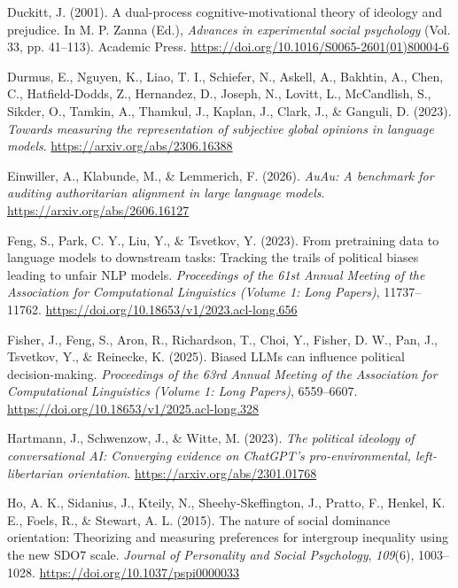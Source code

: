 \documentclass[
]{article}
\newlength{\cslhangindent}
\newenvironment{CSLReferences}[2] %
 {\begin{list}{}{%
  \setlength{\itemindent}{0pt}
  \setlength{\leftmargin}{0pt}
  \setlength{\parsep}{0pt}
  \ifodd #1
   \setlength{\leftmargin}{\cslhangindent}
   \setlength{\itemindent}{-1\cslhangindent}
  \fi
  \setlength{\itemsep}{#2\baselineskip}}}
 {\end{list}}
\begin{document}
\begin{CSLReferences}{1}{0}
Duckitt, J. (2001). A dual-process cognitive-motivational theory of
ideology and prejudice. In M. P. Zanna (Ed.), \emph{Advances in
experimental social psychology} (Vol. 33, pp. 41--113). Academic Press.
\url{https://doi.org/10.1016/S0065-2601(01)80004-6}

Durmus, E., Nguyen, K., Liao, T. I., Schiefer, N., Askell, A., Bakhtin,
A., Chen, C., Hatfield-Dodds, Z., Hernandez, D., Joseph, N., Lovitt, L.,
McCandlish, S., Sikder, O., Tamkin, A., Thamkul, J., Kaplan, J., Clark,
J., \& Ganguli, D. (2023). \emph{Towards measuring the representation of
subjective global opinions in language models}.
\url{https://arxiv.org/abs/2306.16388}

Einwiller, A., Klabunde, M., \& Lemmerich, F. (2026). \emph{{AuAu}: A
benchmark for auditing authoritarian alignment in large language
models}. \url{https://arxiv.org/abs/2606.16127}

Feng, S., Park, C. Y., Liu, Y., \& Tsvetkov, Y. (2023). From pretraining
data to language models to downstream tasks: Tracking the trails of
political biases leading to unfair {NLP} models. \emph{Proceedings of
the 61st Annual Meeting of the Association for Computational Linguistics
(Volume 1: Long Papers)}, 11737--11762.
\url{https://doi.org/10.18653/v1/2023.acl-long.656}

Fisher, J., Feng, S., Aron, R., Richardson, T., Choi, Y., Fisher, D. W.,
Pan, J., Tsvetkov, Y., \& Reinecke, K. (2025). Biased {LLMs} can
influence political decision-making. \emph{Proceedings of the 63rd
Annual Meeting of the Association for Computational Linguistics (Volume
1: Long Papers)}, 6559--6607.
\url{https://doi.org/10.18653/v1/2025.acl-long.328}

Hartmann, J., Schwenzow, J., \& Witte, M. (2023). \emph{The political
ideology of conversational {AI}: Converging evidence on {ChatGPT}'s
pro-environmental, left-libertarian orientation}.
\url{https://arxiv.org/abs/2301.01768}

Ho, A. K., Sidanius, J., Kteily, N., Sheehy-Skeffington, J., Pratto, F.,
Henkel, K. E., Foels, R., \& Stewart, A. L. (2015). The nature of social
dominance orientation: Theorizing and measuring preferences for
intergroup inequality using the new {SDO7} scale. \emph{Journal of
Personality and Social Psychology}, \emph{109}(6), 1003--1028.
\url{https://doi.org/10.1037/pspi0000033}


\end{CSLReferences}
\end{document}
